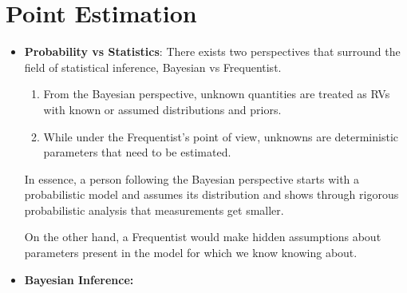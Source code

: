 \section{Point Estimation}
\begin{itemize}
	\item \textbf{Probability vs Statistics}: There exists two perspectives
	      that surround the field of statistical inference,
	      Bayesian vs Frequentist.
	      \begin{enumerate}
		      \item From the Bayesian perspective, unknown quantities
		            are treated as RVs with known or assumed distributions and priors.
		      \item While under the Frequentist's point of view, unknowns
		            are deterministic parameters that need to be estimated.
	      \end{enumerate}
	      In essence, a person following the Bayesian perspective starts
	      with a probabilistic model and assumes its distribution and shows
	      through rigorous probabilistic analysis that measurements get
	      smaller.

	      On the other hand, a Frequentist would make hidden assumptions about
	      parameters present in the model for which we know knowing about.
	\item \textbf{Bayesian Inference:}
\end{itemize}
